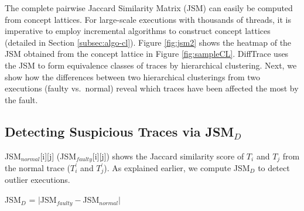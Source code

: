 % 
%

The complete pairwise Jaccard Similarity Matrix (JSM) can easily be computed from concept lattices.
%
For large-scale executions with thousands of threads, it is imperative
to employ incremental algorithms to
construct concept lattices (detailed in Section \ref{subsec:algo-cl}).
%
%
Figure \ref{fig:jsm2}
shows the heatmap
of the JSM obtained from the concept lattice in Figure \ref{fig:sampleCL}.
%
DiffTrace uses the JSM to form equivalence classes of traces by hierarchical clustering.
%
Next, we show how the differences between two hierarchical clusterings from two executions
(faulty vs.~normal) reveal which traces have been affected the most by the fault.


\subsection{Detecting Suspicious Traces via JSM$_{D}$}
JSM$_{normal}$[i][j] (JSM$_{faulty}$[i][j]) shows the Jaccard similarity score of $T_i$ and $T_j$ from the normal trace ($T_i^\prime$ and $T_j^\prime$).
% 
%
As explained earlier, we compute
JSM$_{D}$ to detect outlier executions.

JSM$_{D}$ = $|$JSM$_{faulty} - $JSM$_{normal}|$

